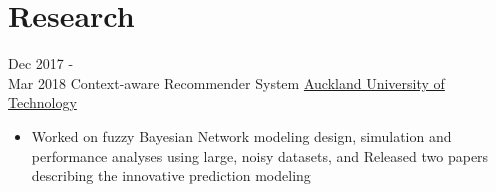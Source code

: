 \documentclass[letterpaper]{twentysecondcv} %
\begin{document}
\section{Research}
\begin{twenty}
	\twentyitem
    	{Dec 2017 - \\Mar 2018}
        {Context-aware Recommender System}
        {\href{http://www.aut.ac.nz/}{Auckland University of Technology}}
        {}
        {
        {\begin{itemize}
        \item Worked on fuzzy Bayesian Network modeling design, simulation and performance analyses using large, noisy datasets, and Released two papers describing the innovative prediction modeling 
    \end{itemize}}
        }
\end{twenty}
\end{document}
